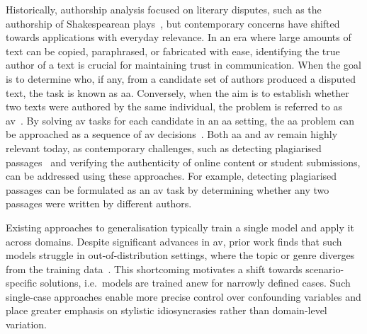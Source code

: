Historically, authorship analysis focused on literary disputes, such as the authorship of Shakespearean plays~\citep{neal_surveying_2018,stamatatos_survey_2009}, but contemporary concerns have shifted towards applications with everyday relevance.
In an era where large amounts of text can be copied, paraphrased, or fabricated with ease, identifying the true author of a text is crucial for maintaining trust in communication. 
%
When the goal is to determine who, if any, from a candidate set of authors produced a disputed text, the task is known as \ac{aa}. 
Conversely, when the aim is to establish whether two texts were authored by the same individual, the problem is referred to as \ac{av}~\citep{koppel_authorship_2004}. 
By solving \ac{av} tasks for each candidate in an \ac{aa} setting, the \ac{aa} problem can be approached as a sequence of \ac{av} decisions~\citep{tyo_state_2022,barlas_cross_domain_2020}.
%
Both \ac{aa} and \ac{av} remain highly relevant today, as contemporary challenges, such as detecting plagiarised passages~\citep{stein_intrinsic_2011} and verifying the authenticity of online content or student submissions, can be addressed using these approaches. 
For example, detecting plagiarised passages can be formulated as an \ac{av} task by determining whether any two passages were written by different authors.



Existing approaches to generalisation typically train a single model and apply it across domains.
Despite significant advances in \ac{av}, prior work finds that such models struggle in out-of-distribution settings, where the topic or genre diverges from the training data~\citep{Sundararajan_style_18,bischoff_importance_2020,li_learning_2025}. 
This shortcoming motivates a shift towards scenario-specific solutions, i.e.\ models are trained anew for narrowly defined cases. 
Such single-case approaches enable more precise control over confounding variables and place greater emphasis on stylistic idiosyncrasies rather than domain-level variation.

